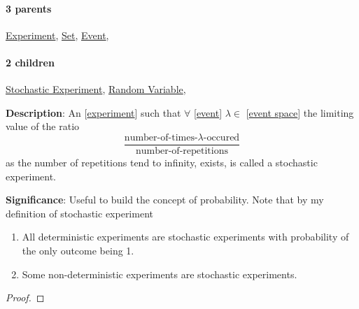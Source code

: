 \documentclass[../main.tex]{subfiles}
\begin{document}
\paragraph{3 parents} \hyperref[statement:Experiment]{Experiment}, \hyperref[statement:Set]{Set}, \hyperref[statement:Event]{Event}, 
\paragraph{2 children} \hyperref[statement:Stochastic Experiment]{Stochastic Experiment}, \hyperref[statement:Random Variable]{Random Variable}, 




\begin{statement}
\label{statement:Stochastic Experiment}\hspace*{0pt}\par
\end{statement}
\textbf{Description}:
An [\hyperref[statement:Experiment]{experiment}] such that $\forall$ [\hyperref[statement:Event]{event}] $ \lambda \in $ [\hyperref[statement:Event Space]{event space}] the limiting value of the ratio
\[
\frac{\text{number-of-times-$\lambda$-occured}}{\text{number-of-repetitions}}
\]
as the number of repetitions tend to infinity, exists, is called a stochastic experiment.
\par
{\color{magenta} \textbf{Significance}:
Useful to build the concept of probability.
Note that by my definition of stochastic experiment
\begin{enumerate}[nolistsep]
    \item All deterministic experiments are stochastic experiments with probability of the only outcome being 1.
    \item Some non-deterministic experiments are stochastic experiments.
\end{enumerate}
\begin{center}
\end{center}
\par}
\begin{proof}
\proofbydefinition
\end{proof}\par
\end{document}
